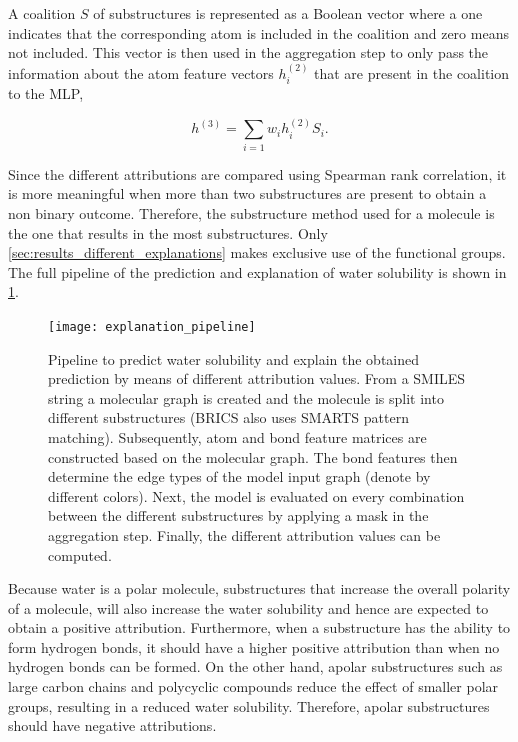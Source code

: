 A coalition $S$ of substructures is represented as a Boolean vector where a one indicates 
that the corresponding atom is included in the coalition and zero means not included. This 
vector is then used in the aggregation step to only pass the information about the atom feature 
vectors $h_i^{(2)}$ that are present in the coalition to the MLP,

\begin{equation}
    h^{(3)} = \sum_{i=1} w_i h_i^{(2)} S_i.
\end{equation}

Since the different attributions are compared using Spearman rank correlation, it 
is more meaningful when more than two substructures are present to obtain a non binary 
outcome. Therefore, the substructure method used for a molecule is the one that results 
in the most substructures. Only \cref{sec:results_different_explanations} makes exclusive 
use of the functional groups. The full pipeline of the prediction and explanation 
of water solubility is shown in \cref{fig:pipeline}.


\begin{figure}
    \centering 
    \texttt{[image: explanation\_pipeline]}
    \caption{Pipeline to predict water solubility and explain the obtained prediction by means 
        of different attribution values. From a SMILES string a molecular graph is created and 
        the molecule is split into different substructures (BRICS also uses SMARTS pattern matching).
        Subsequently, atom and bond feature matrices are constructed based on the molecular graph. The 
        bond features then determine the edge types of the model input graph (denote by different colors).
        Next, the model is evaluated on every combination between the different substructures by applying
        a mask in the aggregation step. Finally, the different attribution values can be computed.
    }
    \label{fig:pipeline}
\end{figure}



Because water is a polar molecule, substructures that increase the overall polarity 
of a molecule, will also increase the water solubility and hence are expected to obtain 
a positive attribution. Furthermore, when a substructure has the ability to form hydrogen 
bonds, it should have a higher positive attribution than when no hydrogen bonds can be 
formed. On the other hand, apolar substructures such as large carbon chains and polycyclic
compounds reduce the effect of smaller polar groups, resulting in a reduced 
water solubility. Therefore, apolar substructures should have negative attributions. 




